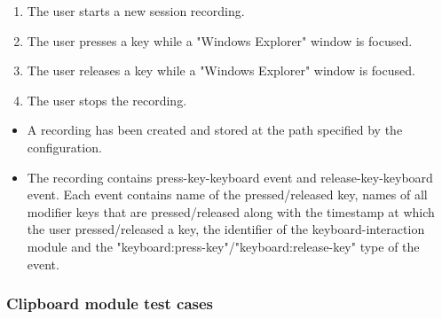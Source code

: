 \begin{tests}
	{\begin{enumerate}
		\item The \gls{user} starts a new session recording.
		\item The \gls{user} presses a key while a "Windows Explorer" window is focused.
		\item The \gls{user} releases a key while a "Windows Explorer" window is focused.
		\item The \gls{user} stops the recording.
	\end{enumerate}}
	{\begin{itemize}
		\item A recording has been created and stored at the path specified by the configuration.
		\item The recording contains press-key-keyboard event and release-key-keyboard event. Each event contains name of the pressed/released key, names of all modifier keys that are pressed/released along with the timestamp at which the user pressed/released a key, the identifier of the keyboard-interaction module and the "keyboard:press-key"/"keyboard:release-key" type of the event.
	\end{itemize}}
\end{tests}

\subsubsection{Clipboard module test cases}
	
